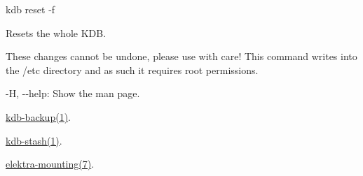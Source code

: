 {\ttfamily kdb reset -\/f}

Resets the whole K\+DB.

These changes cannot be undone, please use with care! This command writes into the {\ttfamily /etc} directory and as such it requires root permissions.


\begin{DoxyItemize}
\item {\ttfamily -\/H}, {\ttfamily -\/-\/help}\+: Show the man page.
\end{DoxyItemize}


\begin{DoxyItemize}
\item \mbox{\hyperlink{doc_help_kdb-backup_md}{kdb-\/backup(1)}}.
\item \mbox{\hyperlink{doc_help_kdb-stash_md}{kdb-\/stash(1)}}.
\item \mbox{\hyperlink{doc_help_elektra-mounting_md}{elektra-\/mounting(7)}}. 
\end{DoxyItemize}
